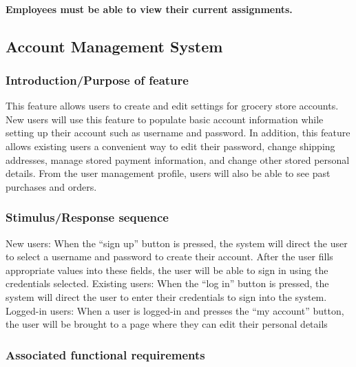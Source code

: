 \documentclass{scrreprt}
\theoremstyle{funreq}
\begin{document}
\paragraph[]{\normalfont Employees must be able to view their current assignments.}

\subsection{Account Management System}
\subsubsection{Introduction/Purpose of feature}
This feature allows users to create and edit settings for grocery store accounts.  New users will use this feature to populate basic account information while setting up their account such as username and password.  In addition, this feature allows existing users a convenient way to edit their password, change shipping addresses, manage stored payment information, and change other stored personal details.  From the user management profile, users will also be able to see past purchases and orders.

\subsubsection{Stimulus/Response sequence}
\indent New users: When the “sign up” button is pressed, the system will direct the user to select a username and password to create their account.  After the user fills appropriate values into these fields, the user will be able to sign in using the credentials selected.
Existing users: When the “log in” button is pressed, the system will direct the user to enter their credentials to sign into the system.  
Logged-in users: When a user is logged-in and presses the “my account” button, the user will be brought to a page where they can edit their personal details

\subsubsection{Associated functional requirements}
\end{document}
